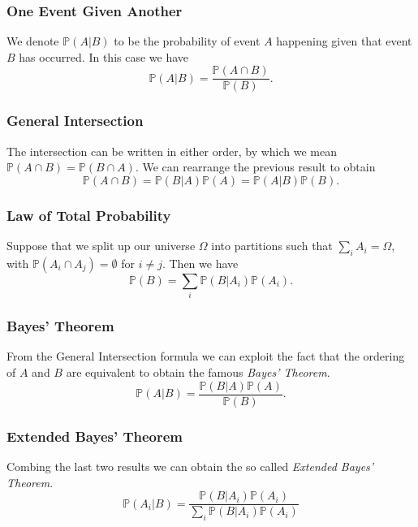 \documentclass[11pt]{article}
\begin{document}
\subsubsection*{One Event Given Another}
We denote $\mathbb{P}(A | B)$ to be the probability of event $A$ happening given that event $B$ has occurred. In this case we have
\begin{equation}
    \mathbb{P}(A | B) = \frac{\mathbb{P}(A \cap B)}{\mathbb{P}(B)}.
\end{equation}

\subsubsection*{General Intersection}
The intersection can be written in either order, by which we mean $\mathbb{P}(A \cap B) = \mathbb{P}(B \cap A)$. We can rearrange the previous result to obtain
\begin{equation}
    \mathbb{P}(A \cap B) = \mathbb{P}(B | A) \mathbb{P}(A) = \mathbb{P}(A|B) \mathbb{P}(B).
\end{equation}

\subsubsection*{Law of Total Probability}
Suppose that we split up our universe $\Omega$ into partitions such that $\sum_i A_i = \Omega$, with $\mathbb{P}(A_i \cap A_j) = \emptyset$ for $i \neq j$. Then we have
\begin{equation}
    \mathbb{P}(B) = \sum_{i} \mathbb{P}(B | A_i) \mathbb{P}(A_i). 
\end{equation}

\subsubsection*{Bayes' Theorem}
From the General Intersection formula we can exploit the fact that the ordering of $A$ and $B$ are equivalent to obtain the famous \textit{Bayes' Theorem}.
\begin{equation}
    \mathbb{P}(A | B) = \frac{\mathbb{P}(B | A) \mathbb{P}(A)}{\mathbb{P}(B)}.
\end{equation}

\subsubsection*{Extended Bayes' Theorem}
Combing the last two results we can obtain the so called \textit{Extended Bayes' Theorem}.
\begin{equation}
    \mathbb{P}(A_i | B) = \frac{\mathbb{P}(B | A_i) \mathbb{P}(A_i)}{\sum_{i} \mathbb{P}(B | A_i) \mathbb{P}(A_i)}
\end{equation}
\end{document}
